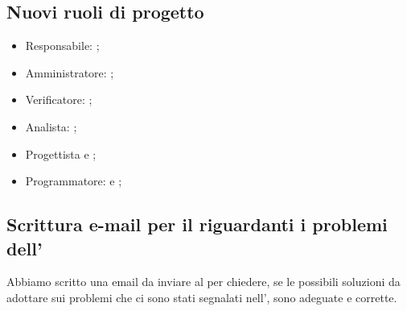 \subsection{Nuovi ruoli di progetto}

\begin{itemize}
	\item Responsabile: \PF;
	\item Amministratore: \LD;
	\item Verificatore: \CE;
	\item Analista: \MC;
	\item Progettista \BR{} e \AT;
	\item Programmatore: \DF{} e \SE;
\end{itemize}

\subsection{Scrittura e-mail per il \CR{} riguardanti i problemi dell'\AdR}

Abbiamo scritto una email da inviare al \CR{} per chiedere, se le possibili soluzioni da adottare sui problemi che ci sono stati segnalati nell'\AdR, sono adeguate e corrette. 
